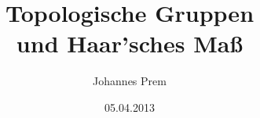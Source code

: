 
\subject{Seminar: Maßtheorie}
\title{Topologische Gruppen\\ und Haar'sches Maß}
\author{Johannes Prem}
\date{05.04.2013}

\maketitle
